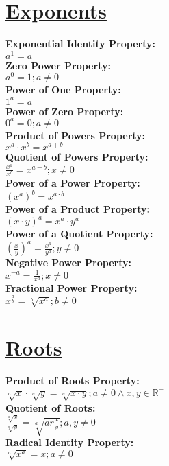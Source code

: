 \documentclass[12pt]{article}
\begin{document}
\section*{\underline{\textbf{Exponents}}}
\textbf{Exponential Identity Property:}
    \\ \( a^1 = a \)
\\ \textbf{Zero Power Property:}
    \\ \( a^0 = 1 ; a \ne 0 \)
\\ \textbf{Power of One Property:}
    \\ \( 1^a = a \)
\\ \textbf{Power of Zero Property:}
    \\ \( 0^a = 0 ; a \ne 0 \)
\\ \textbf{Product of Powers Property:}
    \\ \( x^a \cdot x^b = x^{a + b} \)
\\ \textbf{Quotient of Powers Property:}
    \\ \( \displaystyle\frac{ x^a }{ x^b } = x^{a - b} ; x \ne 0 \)
\\ \textbf{Power of a Power Property:}
    \\ \( (x^a)^b = x^{a \cdot b} \)
\\ \textbf{Power of a Product Property:}
    \\ \( (x \cdot y)^a = x^a \cdot y^a \)
\\ \textbf{Power of a Quotient Property:}
    \\ \( \left( \frac{ x }{ y } \right)^a = \frac{ x^a }{ y^a } ; y \ne 0 \)
\\ \textbf{Negative Power Property:}
    \\ \( x^{-a} = \frac{ 1 }{ x^a } ; x \ne 0 \)
\\ \textbf{Fractional Power Property:}
    \\ \( x^{\frac{ a }{ b }} = \displaystyle\sqrt[b]{x^a} ; b \ne 0 \)



\section*{\underline{\textbf{Roots}}}
\textbf{Product of Roots Property:}
    \\ \( \displaystyle\sqrt[a]{x} \cdot \displaystyle\sqrt[a]{y} = \displaystyle\sqrt[a]{x \cdot y} ; a \ne 0 \land x, y \in \mathbb{R}^+ \)
\\ \textbf{Quotient of Roots:}
    \\ \( \displaystyle\frac{ \displaystyle\sqrt[a]{x} }{ \displaystyle\sqrt[a]{y} } = \displaystyle\sqrt[a]{ar\displaystyle\frac{ x }{ y }} ; a, y \ne 0 \)
\\ \textbf{Radical Identity Property:}
    \\ \( \displaystyle\sqrt[a]{x^a} = x ; a \ne 0 \)
\end{document}
